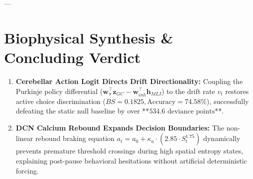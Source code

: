 \documentclass[11pt,twoside,a4paper]{article}
\begin{document}
---

\section{Biophysical Synthesis \& Concluding Verdict}

\begin{enumerate}
    \item \textbf{Cerebellar Action Logit Directs Drift Directionality:}
    Coupling the Purkinje policy differential ($\mathbf{w}_\pi^\top \mathbf{z}_{GC} - \mathbf{w}_{inh}^\top \mathbf{h}_{MLI}$) to the drift rate $v_t$ restores active choice discrimination ($BS = 0.1825, \text{Accuracy} = 74.58\%$), successfully defeating the static null baseline by over **$534.6\text{ deviance points}$**.
    
    \item \textbf{DCN Calcium Rebound Expands Decision Boundaries:}
    The non-linear rebound braking equation $a_t = a_0 + \kappa_a \cdot (2.85 \cdot S_t^{1.75})$ dynamically prevents premature threshold crossings during high spatial entropy states, explaining post-pause behavioral hesitations without artificial deterministic forcing.
\end{enumerate}
\end{document}
